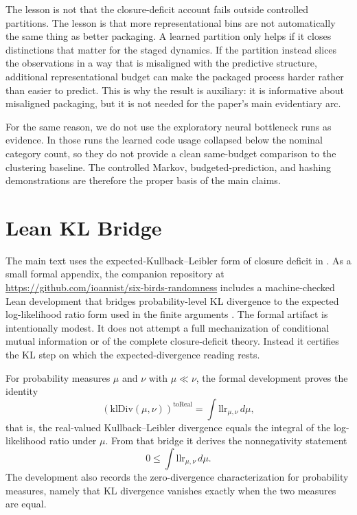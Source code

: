 \documentclass[11pt]{article}
\numberwithin{equation}{section}
\begin{document}
The lesson is not that the closure-deficit account fails outside controlled partitions. The lesson is that more representational bins are not automatically the same thing as better packaging. A learned partition only helps if it closes distinctions that matter for the staged dynamics. If the partition instead slices the observations in a way that is misaligned with the predictive structure, additional representational budget can make the packaged process harder rather than easier to predict. This is why the result is auxiliary: it is informative about misaligned packaging, but it is not needed for the paper's main evidentiary arc.

For the same reason, we do not use the exploratory neural bottleneck runs as evidence. In those runs the learned code usage collapsed below the nominal category count, so they do not provide a clean same-budget comparison to the clustering baseline. The controlled Markov, budgeted-prediction, and hashing demonstrations are therefore the proper basis of the main claims.
 \section{Lean KL Bridge}\label{app:lean}

The main text uses the expected-Kullback--Leibler form of closure deficit in . As a small formal appendix, the companion repository at \url{https://github.com/ioannist/six-birds-randomness} includes a machine-checked Lean development that bridges probability-level KL divergence to the expected log-likelihood ratio form used in the finite arguments \citep{demoura2015leantheoremprover,mathlib2020leanmathematicallibrary}. The formal artifact is intentionally modest. It does not attempt a full mechanization of conditional mutual information or of the complete closure-deficit theory. Instead it certifies the KL step on which the expected-divergence reading rests.

For probability measures $\mu$ and $\nu$ with $\mu \ll \nu$, the formal development proves the identity
\[
(\mathrm{klDiv}(\mu,\nu))^{\mathrm{toReal}}
=
\int \mathrm{llr}_{\mu,\nu}\, d\mu,
\]
that is, the real-valued Kullback--Leibler divergence equals the integral of the log-likelihood ratio under $\mu$. From that bridge it derives the nonnegativity statement
\[
0 \le \int \mathrm{llr}_{\mu,\nu}\, d\mu.
\]
The development also records the zero-divergence characterization for probability measures, namely that KL divergence vanishes exactly when the two measures are equal.
\end{document}
